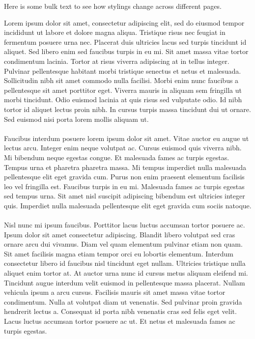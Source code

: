 Here is some bulk text to see how stylings change across different pages.

Lorem ipsum dolor sit amet, consectetur adipiscing elit, sed do eiusmod tempor incididunt ut labore et dolore magna aliqua. Tristique risus nec feugiat in fermentum posuere urna nec. Placerat duis ultricies lacus sed turpis tincidunt id aliquet. Sed libero enim sed faucibus turpis in eu mi. Sit amet massa vitae tortor condimentum lacinia. Tortor at risus viverra adipiscing at in tellus integer. Pulvinar pellentesque habitant morbi tristique senectus et netus et malesuada. Sollicitudin nibh sit amet commodo nulla facilisi. Morbi enim nunc faucibus a pellentesque sit amet porttitor eget. Viverra mauris in aliquam sem fringilla ut morbi tincidunt. Odio euismod lacinia at quis risus sed vulputate odio. Id nibh tortor id aliquet lectus proin nibh. In cursus turpis massa tincidunt dui ut ornare. Sed euismod nisi porta lorem mollis aliquam ut.
\\\\
Faucibus interdum posuere lorem ipsum dolor sit amet. Vitae auctor eu augue ut lectus arcu. Integer enim neque volutpat ac. Cursus euismod quis viverra nibh. Mi bibendum neque egestas congue. Et malesuada fames ac turpis egestas. Tempus urna et pharetra pharetra massa. Mi tempus imperdiet nulla malesuada pellentesque elit eget gravida cum. Purus non enim praesent elementum facilisis leo vel fringilla est. Faucibus turpis in eu mi. Malesuada fames ac turpis egestas sed tempus urna. Sit amet nisl suscipit adipiscing bibendum est ultricies integer quis. Imperdiet nulla malesuada pellentesque elit eget gravida cum sociis natoque.
\\\\
Nisl nunc mi ipsum faucibus. Porttitor lacus luctus accumsan tortor posuere ac. Ipsum dolor sit amet consectetur adipiscing. Blandit libero volutpat sed cras ornare arcu dui vivamus. Diam vel quam elementum pulvinar etiam non quam. Sit amet facilisis magna etiam tempor orci eu lobortis elementum. Interdum consectetur libero id faucibus nisl tincidunt eget nullam. Ultricies tristique nulla aliquet enim tortor at. At auctor urna nunc id cursus metus aliquam eleifend mi. Tincidunt augue interdum velit euismod in pellentesque massa placerat. Nullam vehicula ipsum a arcu cursus. Facilisis mauris sit amet massa vitae tortor condimentum. Nulla at volutpat diam ut venenatis. Sed pulvinar proin gravida hendrerit lectus a. Consequat id porta nibh venenatis cras sed felis eget velit. Lacus luctus accumsan tortor posuere ac ut. Et netus et malesuada fames ac turpis egestas.
